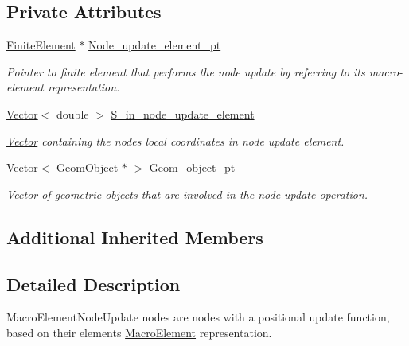 \subsection*{Private Attributes}
\begin{DoxyCompactItemize}
\item 
\hyperlink{classoomph_1_1FiniteElement}{Finite\+Element} $\ast$ \hyperlink{classoomph_1_1MacroElementNodeUpdateNode_acf9d92fa04ab826b442a25625b823e9f}{Node\+\_\+update\+\_\+element\+\_\+pt}
\begin{DoxyCompactList}\small\item\em Pointer to finite element that performs the node update by referring to its macro-\/element representation. \end{DoxyCompactList}\item 
\hyperlink{classoomph_1_1Vector}{Vector}$<$ double $>$ \hyperlink{classoomph_1_1MacroElementNodeUpdateNode_a7fce23ebb05f63487c89cdc8e8dbb5ac}{S\+\_\+in\+\_\+node\+\_\+update\+\_\+element}
\begin{DoxyCompactList}\small\item\em \hyperlink{classoomph_1_1Vector}{Vector} containing the node\textquotesingle{}s local coordinates in node update element. \end{DoxyCompactList}\item 
\hyperlink{classoomph_1_1Vector}{Vector}$<$ \hyperlink{classoomph_1_1GeomObject}{Geom\+Object} $\ast$ $>$ \hyperlink{classoomph_1_1MacroElementNodeUpdateNode_ab387f86ea45654eacc37c5f69127dc02}{Geom\+\_\+object\+\_\+pt}
\begin{DoxyCompactList}\small\item\em \hyperlink{classoomph_1_1Vector}{Vector} of geometric objects that are involved in the node update operation. \end{DoxyCompactList}\end{DoxyCompactItemize}
\subsection*{Additional Inherited Members}


\subsection{Detailed Description}
Macro\+Element\+Node\+Update nodes are nodes with a positional update function, based on their element\textquotesingle{}s \hyperlink{classoomph_1_1MacroElement}{Macro\+Element} representation. 

